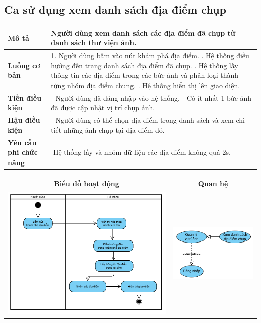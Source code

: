 \subsection{Ca sử dụng xem danh sách địa điểm chụp}

\vspace{0.5cm}

\noindent 
\begin{tabularx}{\linewidth}{| l | X |} 
\hline 
\textbf{Mô tả} & Người dùng xem danh sách các địa điểm đã chụp từ danh sách thư viện ảnh. \\
\hline 
\textbf{Luồng cơ bản} & 1. Người dùng bấm vào nút khám phá địa điểm. \newline
                       2. Hệ thống điều hướng đến trang danh sách địa điểm đã chụp. \newline
                       3. Hệ thống lấy thông tin các địa điểm trong các bức ảnh và phân loại thành từng nhóm địa điểm chung. \newline
                       5. Hệ thống hiển thị lên giao diện. \\
\hline
\textbf{Tiền điều kiện} & - Người dùng đã đăng nhập vào hệ thống. \newline
                          - Có ít nhất 1 bức ảnh đã được cập nhật vị trí chụp ảnh. \\
\hline
\textbf{Hậu điều kiện} & - Người dùng có thể chọn địa điểm trong danh sách và xem chi tiết những ảnh chụp tại địa điểm đó. \\
\hline 
\textbf{Yêu cầu phi chức năng} & -Hệ thống lấy và nhóm dữ liệu các địa điểm không quá 2s. \\
\hline 
\end{tabularx}

\vspace{0.8cm}

\noindent 
\begin{tabular}{| c | c |}
    \hline
    \textbf{Biểu đồ hoạt động} & \textbf{Quan hệ} \\ 
    \hline
    \includegraphics[width=0.6\linewidth]{figures/c3/3-3-13-activity-diagram.png} 
    &  
    \includegraphics[width=0.35\linewidth]{figures/c3/3-3-13-relationship.png} \\ 
    \hline
\end{tabular}

